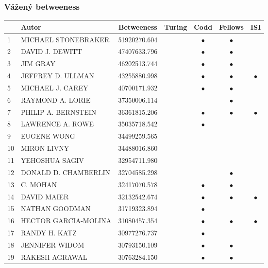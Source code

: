 \documentclass[12pt,titlepage]{report}
\begin{document}
\subsubsection{Vážený betweeness}
\begin{center}
\begin{tabular}{|l|l|c|c|c|c|c|}
\hline
& {\bf Autor} & {\bf Betweeness} & {\bf Turing} & {\bf Codd} & {\bf Fellows} & {\bf ISI} \\
\hline
1  & MICHAEL STONEBRAKER & 51920270.604 & & $\bullet$ & $\bullet$ &   \\
\hline
2  & DAVID J. DEWITT & 47407633.796& & $\bullet$ & $\bullet$ &           \\
\hline
3  & JIM GRAY & 46202513.744& & $\bullet$ & $\bullet$ &           \\
\hline
4  & JEFFREY D. ULLMAN & 43255880.998  & & $\bullet$ & $\bullet$ & $\bullet$ \\
\hline
5  & MICHAEL J. CAREY & 40700171.932 & & $\bullet$ & $\bullet$ &         \\
\hline
6  & RAYMOND A. LORIE & 37350006.114 & &           & $\bullet$ &           \\
\hline
7  & PHILIP A. BERNSTEIN & 36361815.206 & & $\bullet$ & $\bullet$ & $\bullet$ \\
\hline
8  & LAWRENCE A. ROWE & 35035718.542 &&$\bullet$&&\\
\hline
9  & EUGENE WONG & 34499259.565&         &         &         & \\
\hline
10 & MIRON LIVNY & 34488016.860&&         &         &         \\
\hline
11 & YEHOSHUA SAGIV & 32954711.980& &         &         &         \\
\hline
12 & DONALD D. CHAMBERLIN & 32704585.298& &           & $\bullet$ &           \\
\hline
13 & C. MOHAN & 32417070.578& & $\bullet$ & $\bullet$ &         \\
\hline
14 & DAVID MAIER & 32132542.674& &$\bullet$&$\bullet$&$\bullet$\\
\hline
15 & NATHAN GOODMAN & 31719323.894& & $\bullet$ &         &         \\
\hline
16 & HECTOR GARCIA-MOLINA & 31080457.354& & $\bullet$ & $\bullet$ & $\bullet$ \\
\hline
17 & RANDY H. KATZ & 30977276.737 &&$\bullet$&&\\
\hline
18 & JENNIFER WIDOM & 30793150.109&         &$\bullet$&$\bullet$& \\
\hline
19 & RAKESH AGRAWAL & 30763284.150&&$\bullet$&$\bullet$&         \\

\end{tabular}
\end{center}
\end{document}
